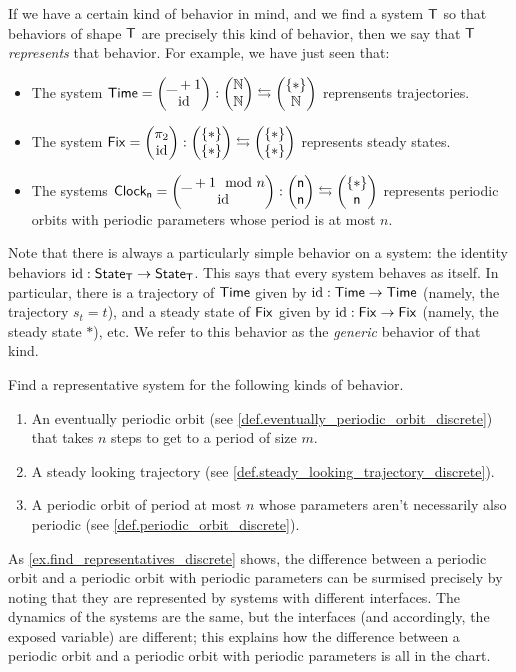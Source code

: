 \documentclass[DynamicalBook]{subfiles}
\begin{document}
If we have a certain kind of behavior in mind, and we find a system $\mathsf{T}$ so
that behaviors of shape $\mathsf{T}$ are precisely this kind of behavior, then we
say that $\mathsf{T}$ \emph{represents} that behavior. For example, we have just
seen that:
\begin{itemize}
  \item The system $\mathsf{Time} = \begin{pmatrix}{\_ + 1} \\ {\mathrm{id}} \end{pmatrix} : \begin{pmatrix}{\mathbb{N}} \\ {\mathbb{N}} \end{pmatrix} \leftrightarrows
    \begin{pmatrix}{\{\ast\}} \\ {\mathbb{N}} \end{pmatrix}$ reprensents trajectories.
  \item The system $\mathsf{Fix} = \begin{pmatrix}{\pi_2} \\ {\mathrm{id}} \end{pmatrix} : \begin{pmatrix}{\{\ast\}} \\ {\{\ast\}} \end{pmatrix}
    \leftrightarrows \begin{pmatrix}{\{\ast\}} \\ {\{\ast\}} \end{pmatrix}$ represents steady states.
  \item The systems $\mathsf{Clock_n} = \begin{pmatrix}{\_ + 1 \mod n} \\ {\mathrm{id}} \end{pmatrix} :
    \begin{pmatrix}{\mathsf{n}} \\ {\mathsf{n}} \end{pmatrix} \leftrightarrows \begin{pmatrix}{\{\ast\}} \\ {\mathsf{n}} \end{pmatrix}$
    represents periodic orbits with periodic parameters whose period is at most $n$.
\end{itemize}

Note that there is always a particularly simple behavior on a system: the
identity behaviors $\mathrm{id} : \mathsf{State}_{\mathsf{T}} \to \mathsf{State}_{\mathsf{T}}$. This says that every system
behaves as itself. In particular, there is a trajectory of $\mathsf{Time}$ given by
$\mathrm{id} : \mathsf{Time} \to \mathsf{Time}$ (namely, the trajectory $s_t = t$), and a
steady state of $\mathsf{Fix}$ given by $\mathrm{id} : \mathsf{Fix} \to \mathsf{Fix}$ (namely,
the steady state $\ast$), etc. We refer to this behavior as the \emph{generic}
behavior of that kind.

\begin{exercise}\label{ex.find_representatives_discrete}
  Find a representative system for the following kinds of behavior.
  \begin{enumerate}
    \item An eventually periodic orbit (see \cref{def.eventually_periodic_orbit_discrete}) that takes $n$ steps to get to a period
      of size $m$.
    \item A steady looking trajectory (see \cref{def.steady_looking_trajectory_discrete}).
    \item A periodic orbit of period at most $n$ whose parameters aren't
      necessarily also periodic (see \cref{def.periodic_orbit_discrete}).
  \end{enumerate}
\end{exercise}

\begin{remark}\label{rmk.periodic_parameters_versus_not}
As \cref{ex.find_representatives_discrete} shows, the difference between a
periodic orbit and a periodic orbit with periodic parameters can be surmised
precisely by noting that they are represented by systems with different
interfaces. The dynamics of the systems are the same, but the interfaces (and
accordingly, the exposed variable) are different; this explains how the
difference between a periodic orbit and a periodic orbit with periodic
parameters is all in the chart.
\end{remark}
\end{document}
